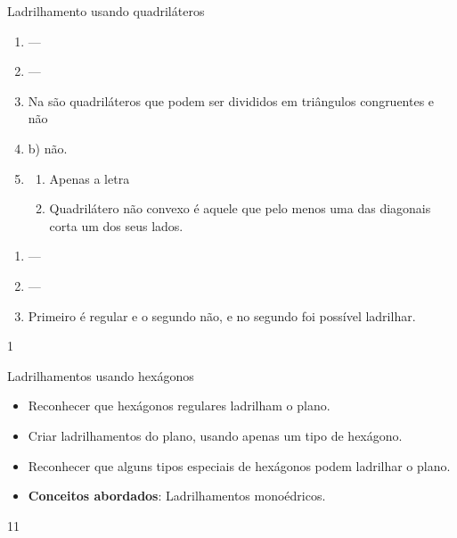 \begin{answer}{Ladrilhamento usando quadriláteros}
{
	
	\begin{enumerate}
	\item ---
	\item ---
	\item Na  são quadriláteros que podem ser divididos em triângulos congruentes e não \item{b)} não.
	\item 
	\begin{enumerate}
	\item Apenas a letra 
	\item Quadrilátero não convexo é aquele que pelo menos uma das diagonais corta um dos seus lados.
	\end{enumerate}
	\end{enumerate}
	\begin{enumerate}
	\item ---
	\item ---
	\item Primeiro é regular e o segundo não, e no segundo foi possível ladrilhar.
	\end{enumerate}
}{1}
\end{answer}
\clearmargin
\begin{objectives}{Ladrilhamentos usando hexágonos}
{
	\begin{itemize}
	\item Reconhecer que hexágonos regulares ladrilham o plano.
	\item Criar ladrilhamentos do plano, usando apenas um tipo de hexágono.
	\item Reconhecer que alguns tipos especiais de hexágonos podem ladrilhar o plano.
	\item \textbf{Conceitos abordados}: Ladrilhamentos monoédricos.
	\end{itemize}
}{1}{1}
\end{objectives}
